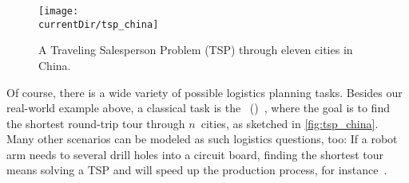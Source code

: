 \begin{figure}%
\centering%
\texttt{[image: \\currentDir/tsp\_china]}%
\caption{A Traveling Salesperson Problem (TSP) through eleven cities in China.}%
%
\label{fig:tsp_china}%
\end{figure}%
%
Of course, there is a wide variety of possible logistics planning tasks.
Besides our real-world example above, a classical task is the ~()~\cite{ABCC2006TTSPACS,LLRKS1985TTSPAGTOCO,GP2002TTSPAIV}, where the goal is to find the shortest round-trip tour through $n$~cities, as sketched in \autoref{fig:tsp_china}.
Many other scenarios can be modeled as such logistics questions, too:
If a robot arm needs to several drill holes into a circuit board, finding the shortest tour means solving a TSP and will speed up the production process, for instance~\cite{GJR1991OCOPADMACS}.%
\endhsection%
%

